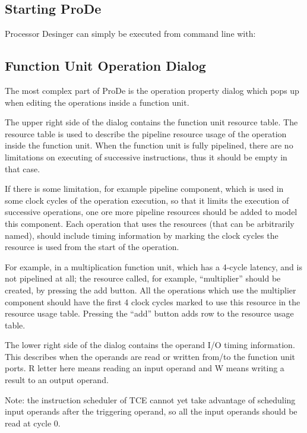 \documentclass[twoside]{tceusermanual}
\begin{document}
\subsection{Starting ProDe}

Processor Desinger can simply be executed from command line with:


\subsection{Function Unit Operation Dialog}

The most complex part of ProDe is the operation property dialog which pops
up when editing the operations inside a function unit.


The upper right side of the dialog contains the function unit resource table.
The resource table is used to describe the pipeline resource usage of the
operation inside the function unit.
When the function unit is fully pipelined, there are no limitations on
executing of successive instructions, thus it should be empty in that case.

If there is some limitation, for example pipeline component, which is used in 
some clock cycles of the operation execution, so that it limits the execution of 
successive operations, one ore more pipeline resources should be added to model 
this component. Each operation that uses the resources (that can be arbitrarily
named), should include timing information by marking the clock cycles the resource
is used from the start of the operation.

For example, in a multiplication function unit, which has a 4-cycle latency,
and is not pipelined at all; the resource called, for example, ``multiplier'' 
should be created, by pressing the add button. All the operations which use the 
multiplier component should have the first 4 clock cycles marked to use this 
resource in the resource usage table. Pressing the ``add'' button adds row to 
the resource usage table.

The lower right side of the dialog contains the operand I/O timing information.
This describes when the operands are read or written from/to the function unit
ports. R letter here means reading an input operand and W means writing a result to 
an output operand.

Note: the instruction scheduler of TCE cannot yet take advantage of scheduling 
input operands after the triggering operand, so all the input operands should be 
read at cycle 0.
\end{document}
